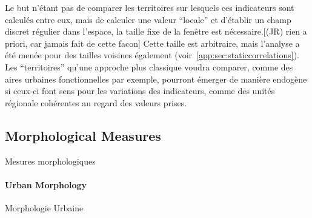 Le but n'étant pas de comparer les territoires sur lesquels ces indicateurs sont calculés entre eux, mais de calculer une valeur ``locale'' et d'établir un champ discret régulier dans l'espace, la taille fixe de la fenêtre est nécessaire.[(JR) rien a priori, car jamais fait de cette facon] Cette taille est arbitraire, mais l'analyse a été menée pour des tailles voisines également (voir~\ref{app:sec:staticcorrelations}). Les ``territoires'' qu'une approche plus classique voudra comparer, comme des aires urbaines fonctionnelles par exemple, pourront émerger de manière endogène si ceux-ci font sens pour les variations des indicateurs, comme des unités régionale cohérentes au regard des valeurs prises.





\subsection{Morphological Measures}{Mesures morphologiques}

\paragraph{Urban Morphology}{Morphologie Urbaine}


